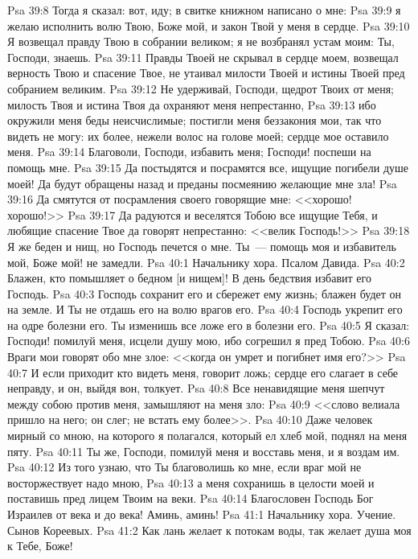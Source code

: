 \vs Psa 39:8 Тогда я сказал: вот, иду; в свитке книжном написано о мне:
\vs Psa 39:9 я желаю исполнить волю Твою, Боже мой, и закон Твой у меня в сердце.
\vs Psa 39:10 Я возвещал правду Твою в собрании великом; я не возбранял устам моим: Ты, Господи, знаешь.
\vs Psa 39:11 Правды Твоей не скрывал в сердце моем, возвещал верность Твою и спасение Твое, не утаивал милости Твоей и истины Твоей пред собранием великим.
\vs Psa 39:12 Не удерживай, Господи, щедрот Твоих от меня; милость Твоя и истина Твоя да охраняют меня непрестанно,
\vs Psa 39:13 ибо окружили меня беды неисчислимые; постигли меня беззакония мои, так что видеть не могу: их более, нежели волос на голове моей; сердце мое оставило меня.
\vs Psa 39:14 Благоволи, Господи, избавить меня; Господи! поспеши на помощь мне.
\vs Psa 39:15 Да постыдятся и посрамятся все, ищущие погибели душе моей! Да будут обращены назад и преданы посмеянию желающие мне зла!
\vs Psa 39:16 Да смятутся от посрамления своего говорящие мне: <<хорошо! хорошо!>>
\vs Psa 39:17 Да радуются и веселятся Тобою все ищущие Тебя, и любящие спасение Твое да говорят непрестанно: <<велик Господь!>>
\vs Psa 39:18 Я же беден и нищ, но Господь печется о мне. Ты~--- помощь моя и избавитель мой, Боже мой! не замедли.
\vs Psa 40:1 Начальнику хора. Псалом Давида.
\rsbpar\vs Psa 40:2 Блажен, кто помышляет о бедном [и нищем]! В день бедствия избавит его Господь.
\vs Psa 40:3 Господь сохранит его и сбережет ему жизнь; блажен будет он на земле. И Ты не отдашь его на волю врагов его.
\vs Psa 40:4 Господь укрепит его на одре болезни его. Ты изменишь все ложе его в болезни его.
\vs Psa 40:5 Я сказал: Господи! помилуй меня, исцели душу мою, ибо согрешил я пред Тобою.
\vs Psa 40:6 Враги мои говорят обо мне злое: <<когда он умрет и погибнет имя его?>>
\vs Psa 40:7 И если приходит кто видеть меня, говорит ложь; сердце его слагает в себе неправду, и он, выйдя вон, толкует.
\vs Psa 40:8 Все ненавидящие меня шепчут между собою против меня, замышляют на меня зло:
\vs Psa 40:9 <<слово велиала пришло на него; он слег; не встать ему более>>.
\vs Psa 40:10 Даже человек мирный со мною, на которого я полагался, который ел хлеб мой, поднял на меня пяту.
\vs Psa 40:11 Ты же, Господи, помилуй меня и восставь меня, и я воздам им.
\vs Psa 40:12 Из того узнаю, что Ты благоволишь ко мне, если враг мой не восторжествует надо мною,
\vs Psa 40:13 а меня сохранишь в целости моей и поставишь пред лицем Твоим на веки.
\vs Psa 40:14 Благословен Господь Бог Израилев от века и до века! Аминь, аминь!
\vs Psa 41:1 Начальнику хора. Учение. Сынов Кореевых.
\rsbpar\vs Psa 41:2 Как лань желает к потокам воды, так желает душа моя к Тебе, Боже!
